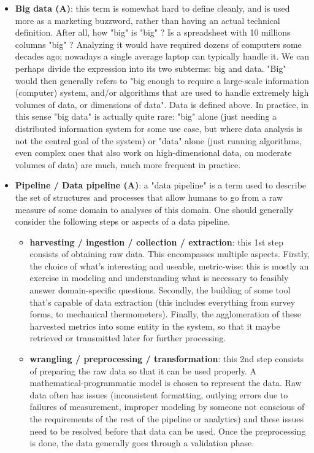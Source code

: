 \documentclass{article}
\begin{document}
\begin{itemize}
	\item \textbf{Big data (A)}: this term is somewhat hard to define cleanly, and is used more as a marketing buzzword, rather than having an actual technical definition. After all, how "big" is "big" ? Is a spreadsheet with 10 millions columns "big" ? Analyzing it would have required dozens of computers some decades ago; nowadays a single average laptop can typically handle it. We can perhaps divide the expression into its two subterms: big and data. "Big" would then generally refers to "big enough to require a large-scale information (computer) system, and/or algorithms that are used to handle extremely high volumes of data, or dimensions of data". Data is defined above. In practice, in this sense "big data" is actually quite rare: "big" alone (just needing a distributed information system for some use case, but where data analysis is not the central goal of the system) or "data" alone (just running algorithms, even complex ones that also work on high-dimensional data, on moderate volumes of data) are much, much more frequent in practice.

	\item \textbf{Pipeline / Data pipeline (A)}: a "data pipeline" is a term used to describe the set of structures and processes that allow humans to go from a raw measure of some domain to analyses of this domain. One should generally consider the following steps or aspects of a data pipeline.
	\begin{itemize}
		\item \textbf{harvesting / ingestion / collection / extraction}: this 1st step consists of obtaining raw data. This encompasses multiple aspects. Firstly, the choice of what's interesting and useable, metric-wise: this is mostly an exercise in modeling and understanding what is necessary to feasibly answer domain-specific questions. Secondly, the building of some tool that's capable of data extraction (this includes everything from survey forms, to mechanical thermometers). Finally, the agglomeration of these harvested metrics into some entity in the system, so that it maybe retrieved or transmitted later for further processing.

		\item \textbf{wrangling / preprocessing / transformation}: this 2nd step consists of preparing the raw data so that it can be used properly. A mathematical-programmatic model is chosen to represent the data. Raw data often has issues (inconsistent formatting, outlying errors due to failures of measurement, improper modeling by someone not conscious of the requirements of the rest of the pipeline or analytics) and these issues need to be resolved before that data can be used. Once the preprocessing is done, the data generally goes through a validation phase.


\end{itemize}
\end{itemize}
\end{document}
